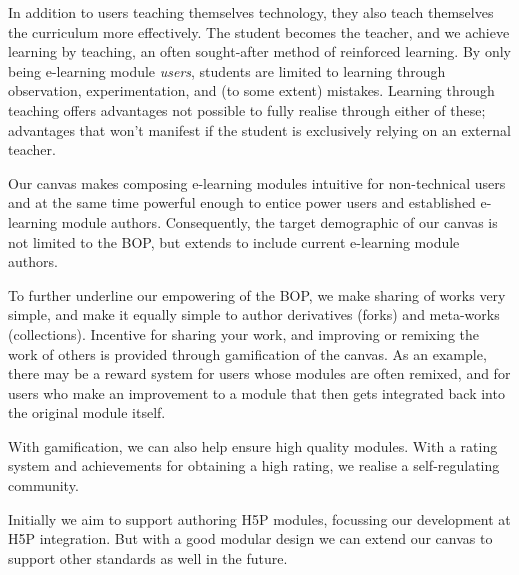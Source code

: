 In addition to users teaching themselves technology, they also teach 
themselves the curriculum more effectively. The student becomes the teacher, 
and we achieve learning by teaching, an often sought-after method of 
reinforced learning. By only being e-learning module \emph{users}, students 
are limited to learning through observation, experimentation, and (to some 
extent) mistakes. Learning through teaching offers advantages not possible to 
fully realise through either of these; advantages that won't manifest if the 
student is exclusively relying on an external 
teacher\cite{cortese2005learning}.

Our canvas makes composing e-learning modules intuitive for non-technical 
users and at the same time powerful enough to entice power users and 
established e-learning module authors. Consequently, the target demographic of 
our canvas is not limited to the BOP, but extends to include current 
e-learning module authors.

To further underline our empowering of the BOP, we make sharing of works very 
simple, and make it equally simple to author derivatives (forks) and 
meta-works (collections). Incentive for sharing your work, and improving or 
remixing the work of others is provided through gamification of the canvas. As 
an example, there may be a reward system for users whose modules are often 
remixed, and for users who make an improvement to a module that then gets 
integrated back into the original module itself.

With gamification, we can also help ensure high quality modules. With a rating 
system and achievements for obtaining a high rating, we realise a 
self-regulating community.

Initially we aim to support authoring H5P modules, focussing our development 
at H5P integration. But with a good modular design we can extend our canvas to 
support other standards as well in the future.
